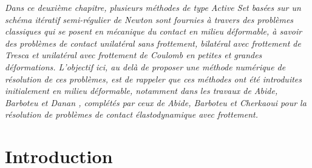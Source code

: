 
\vspace{1cm}


\textit{Dans ce deuxième chapitre, plusieurs méthodes de type Active Set basées sur un schéma itératif semi-régulier de Newton sont fournies à travers des problèmes classiques qui se posent en mécanique du contact en milieu déformable, à savoir des problèmes de contact unilatéral sans frottement, bilatéral avec frottement de Tresca et unilatéral avec frottement de Coulomb en petites et grandes déformations. L'objectif ici, au delà de proposer une méthode numérique de résolution de ces problèmes, est de rappeler que ces méthodes ont été introduites initialement en milieu déformable, notamment dans les travaux de Abide, Barboteu et Danan \cite{abide2016analysis}, complétés par ceux de Abide, Barboteu et Cherkaoui \cite{abide2021inexact} pour la résolution de problèmes de contact élastodynamique avec frottement.}

\vspace{1cm}

\minitoc

\newpage

\section*{Introduction}

